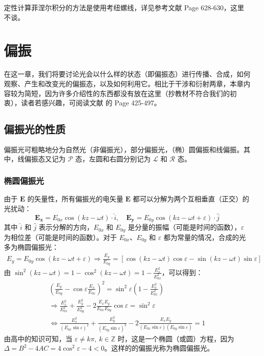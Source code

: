 \documentclass[UTF8]{report}
\def\Z{\mathbb{Z}}
\theoremstyle{MyLineTheoremStyle} %
\theoremstyle{MyBlockTheoremStyle} %
\theoremstyle{MySubsubsectionStyle} %
\begin{document}
定性计算菲涅尔积分的方法是使用考纽螺线，详见参考文献 \cite{Optics} Page 628-630，这里不谈。


\chapter{偏振}\thispagestyle{fancy}
在这一章，我们将要讨论光会以什么样的状态（即偏振态）进行传播、合成，如何观察、产生和改变光的偏振态，以及如何利用它。相比于干涉和衍射两章，本章内容较为简短，因为许多介绍性的东西都没有放在这里（抄教材不符合我们的初衷），读者若感兴趣，可阅读文献 \cite{Optics} 的 Page 425-497。

\section{偏振光的性质}
偏振光可粗略地分为自然光（非偏振光），部分偏振光，（椭）圆偏振和线偏振。其中，线偏振态又记为 $\mathscr{P}$ 态，左圆和右圆分别记为 $\mathscr{L}$ 和 $\mathscr{R}$ 态。
\subsection{椭圆偏振光}
由于 $\boldsymbol{E}$ 的矢量性，所有偏振光的电矢量 $\boldsymbol{E}$ 都可以分解为两个互相垂直（正交）的光扰动：
\begin{equation}
\boldsymbol{E_x} =  E_{0x} \cos(kz - \omega t) \cdot \hat{i},\quad \boldsymbol{E_y} =  E_{0y} \cos(kz - \omega t + \varepsilon) \cdot \hat{j}
\end{equation}
其中 $\hat{i}$ 和 $\hat{j}$ 表示分解的方向，$E_{0x}$ 和 $E_{0y}$ 是分量的振幅（可能是时间的函数），$\varepsilon$ 为相位差（可能是时间的函数）。对于 $E_{0x}$、$E_{0y}$ 和 $\varepsilon$ 都为常量的情况，合成的光多为椭圆偏振光：
\begin{gather}
    E_y = E_{0y} \cos(kz - \omega t + \varepsilon) \Longrightarrow 
    \frac{E_y}{E_{0y}} = 
    \left[\cos(kz - \omega t) \cos \varepsilon - \sin(kz - \omega t) \sin \varepsilon\right] 
\end{gather}
由 $\sin^2 (kz - \omega t) = 1 - \cos^2 (kz - \omega t) = 1 - \frac{E_x^2}{E_{0x}^2}$，可以得到：
\begin{gather}
\left( \frac{E_y}{E_{0y}} -  \cos \varepsilon\frac{E_x}{E_{0x}} \right)^2 = \sin^2 \varepsilon \left( 1 - \frac{E_x^2}{E_{0x}^2} \right) \\ 
\Longrightarrow 
\frac{E_x^2}{E_{0x}^2} + \frac{E_y^2}{E_{0y}^2} - 2 \frac{E_xE_y}{E_{0x}E_{0y}} \cos \varepsilon = \sin^2 \varepsilon 
\\ \label{eq:椭圆偏振光}
\Longleftrightarrow \frac{E_x^2}{(E_{0x} \sin \varepsilon)^2} + \frac{E_y^2}{(E_{0y} \sin \varepsilon)^2} - 2 \frac{E_xE_y}{(E_{0x} \sin \varepsilon )(E_{0y} \sin \varepsilon)} = 1
\end{gather}
由高中的知识可知，当 $\varepsilon \ne k \pi,\  k \in \Z$ 时，这是一个椭圆（或圆）方程，因为 $\Delta = B^2 - 4AC = 4 \cos^2 \varepsilon - 4 < 0$。这样的的偏振光称为椭圆偏振光。
\end{document}
